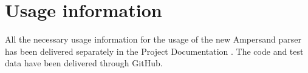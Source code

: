 
\section*{Usage information}
\label{sec:usage-information}
All the necessary usage information for the usage of the new Ampersand parser has been delivered separately in the Project Documentation .
The code and test data have been delivered through GitHub.